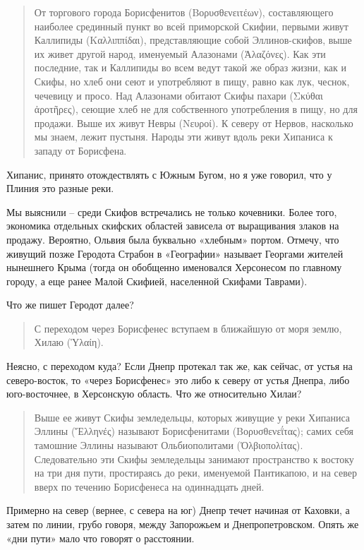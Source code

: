 \begin{quotation}
От торгового города Борисфенитов (Βορυσ\-θενειτέων), составляющего наиболее срединный пункт во всей приморской Скифии, первыми живут Каллипиды (Καλλιππίδαι), представляющие собой Эллинов-скифов, выше их живет другой народ, именуемый Алазонами (Ἀλαζόνες). Как эти последние, так и Каллипиды во всем ведут такой же образ жизни, как и Скифы, но хлеб они сеют и употребляют в пищу, равно как лук, чеснок, чечевицу и просо. Над Алазонами обитают Скифы пахари (Σκύθαι ἀροτῆρες), сеющие хлеб не для собственного употребления в пищу, но для продажи. Выше их живут Невры (Νευροί). К северу от Нервов, насколько мы знаем, лежит пустыня. Народы эти живут вдоль реки Хипаниса к западу от Борисфена.
\end{quotation}

Хипанис, принято отождествлять с Южным Бугом, но я уже говорил, что у Плиния это разные реки.

Мы выяснили – среди Скифов встречались не только кочевники. Более того, экономика отдельных скифских областей зависела от выращивания злаков на продажу. Вероятно, Ольвия была буквально «хлебным» портом. Отмечу, что живущий позже Геродота Страбон в «Географии» называет Георгами жителей нынешнего Крыма (тогда он обобщенно именовался Херсонесом по главному городу, а еще ранее Малой Скифией, населенной Скифами Таврами).

Что же пишет Геродот далее? 

\begin{quotation}
С переходом через Борисфенес вступаем в ближайшую от моря землю, Хилаю (Ὑλαίη).
\end{quotation}

Неясно, с переходом куда? Если Днепр протекал так же, как сейчас, от устья на северо-восток, то «через Борисфенес» это либо к северу от устья Днепра, либо юго-восточнее, в Херсонскую область. Что же относительно Хилаи?

\begin{quotation}
Выше ее живут Скифы земледельцы, которых живущие у реки Хипаниса Эллины (Ἕλλην\-ές) называют Борисфенитами (Βορυσθενεΐτας); самих себя тамошние Эллины называют Ольбиополитами (Ὀλβιοπολίτ\-ας). Следовательно эти Скифы земледельцы занимают пространство к востоку на три дня пути, простираясь до реки, именуемой Пантикапою, и на север вверх по течению Борисфенеса на одиннадцать дней.
\end{quotation}

Примерно на север (вернее, с севера на юг) Днепр течет начиная от Каховки, а затем по линии, грубо говоря, между Запорожьем и Днепропетровском. Опять же «дни пути» мало что говорят о расстоянии. 

